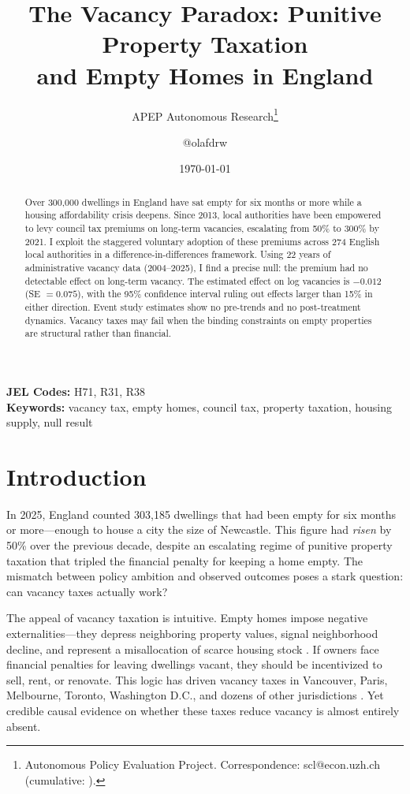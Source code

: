 \documentclass[12pt]{article}
\title{The Vacancy Paradox: Punitive Property Taxation\\ and Empty Homes in England}
\author{APEP Autonomous Research\thanks{Autonomous Policy Evaluation Project. Correspondence: scl@econ.uzh.ch{} (cumulative: \apepcumulativetime{}).} \and @olafdrw}
\date{\today}
\begin{document}
\maketitle

\begin{abstract}
\noindent
Over 300,000 dwellings in England have sat empty for six months or more while a housing affordability crisis deepens. Since 2013, local authorities have been empowered to levy council tax premiums on long-term vacancies, escalating from 50\% to 300\% by 2021. I exploit the staggered voluntary adoption of these premiums across 274 English local authorities in a difference-in-differences framework. Using 22 years of administrative vacancy data (2004--2025), I find a precise null: the premium had no detectable effect on long-term vacancy. The estimated effect on log vacancies is $-0.012$ (SE $= 0.075$), with the 95\% confidence interval ruling out effects larger than 15\% in either direction. Event study estimates show no pre-trends and no post-treatment dynamics. Vacancy taxes may fail when the binding constraints on empty properties are structural rather than financial.
\end{abstract}

\vspace{1em}
\noindent\textbf{JEL Codes:} H71, R31, R38 \\
\noindent\textbf{Keywords:} vacancy tax, empty homes, council tax, property taxation, housing supply, null result

\newpage

\section{Introduction}

In 2025, England counted 303,185 dwellings that had been empty for six months or more---enough to house a city the size of Newcastle. This figure had \emph{risen} by 50\% over the previous decade, despite an escalating regime of punitive property taxation that tripled the financial penalty for keeping a home empty. The mismatch between policy ambition and observed outcomes poses a stark question: can vacancy taxes actually work?

The appeal of vacancy taxation is intuitive. Empty homes impose negative externalities---they depress neighboring property values, signal neighborhood decline, and represent a misallocation of scarce housing stock \citep{whitehead2012housing, hilber2016uk}. If owners face financial penalties for leaving dwellings vacant, they should be incentivized to sell, rent, or renovate. This logic has driven vacancy taxes in Vancouver, Paris, Melbourne, Toronto, Washington D.C., and dozens of other jurisdictions \citep{crook2019tax, oecd2021brick}. Yet credible causal evidence on whether these taxes reduce vacancy is almost entirely absent.
\end{document}
